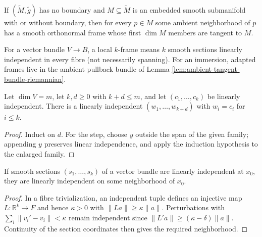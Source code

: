 \begin{proposition}
\label{prop:adapted-orthonormal-frames}

If $(\widetilde M,\widetilde g)$ has no boundary and $M\subseteq\widetilde M$ is an embedded smooth submanifold with or without boundary, then for every $p\in M$ some ambient neighborhood of $p$ has a smooth orthonormal frame whose first $\dim M$ members are tangent to $M$.
\end{proposition}

For a vector bundle $V\to B$, a local $k$-frame means $k$ smooth sections linearly independent in every fibre (not necessarily spanning). For an immersion, adapted frames live in the ambient pullback bundle of Lemma \ref{lem:ambient-tangent-bundle-riemannian}.

\begin{lemma}
\label{lem:ordered-linear-extension}




Let $\dim V=m$, let $k,d\ge0$ with $k+d\le m$, and let $(c_1,\ldots,c_k)$ be linearly independent. There is a linearly independent $(w_1,\ldots,w_{k+d})$ with $w_i=c_i$ for $i\le k$.
\end{lemma}
\begin{proof}

\sketch Induct on $d$. For the step, choose $y$ outside the span of the given family; appending $y$ preserves linear independence, and apply the induction hypothesis to the enlarged family.
\end{proof}

\begin{lemma}
\label{lem:open-linear-independence}




If smooth sections $(s_1,\ldots,s_k)$ of a vector bundle are linearly independent at $x_0$, they are linearly independent on some neighborhood of $x_0$.
\end{lemma}
\begin{proof}

\sketch In a fibre trivialization, an independent tuple defines an injective map $L:\mathbb R^k\to F$ and hence $\kappa>0$ with $\|La\|\ge\kappa\|a\|$. Perturbations with $\sum_i\|v_i'-v_i\|<\kappa$ remain independent since $\|L'a\|\ge(\kappa-\delta)\|a\|$. Continuity of the section coordinates then gives the required neighborhood.
\end{proof}

